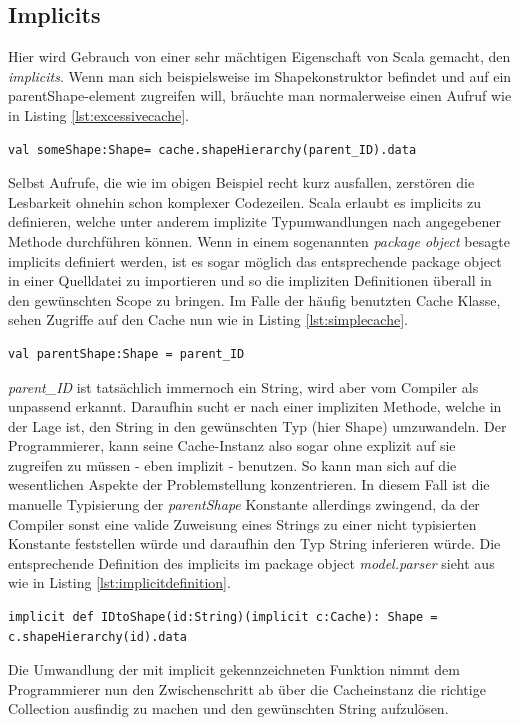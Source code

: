 \subsection{Implicits}\label{sectionimplicit}
Hier wird Gebrauch von einer sehr mächtigen Eigenschaft von Scala gemacht, den \textit{implicits}. Wenn man sich beispielsweise im Shapekonstruktor befindet und auf ein parentShape-element zugreifen will, bräuchte man normalerweise einen Aufruf wie in Listing \ref{lst:excessivecache}.
\begin{lstlisting}[style=scala, caption = {Ausführlicher Zugriff auf ein Cache Element}, label = {lst:excessivecache}]
val someShape:Shape= cache.shapeHierarchy(parent_ID).data
\end{lstlisting}Selbst Aufrufe, die wie im obigen Beispiel recht kurz ausfallen, zerstören die Lesbarkeit ohnehin schon komplexer Codezeilen. Scala erlaubt es implicits zu definieren, welche unter anderem implizite Typumwandlungen nach angegebener Methode durchführen können. Wenn in einem sogenannten \textit{package object} besagte implicits definiert werden, ist es sogar möglich das entsprechende package object in einer Quelldatei zu importieren und so die impliziten Definitionen überall in den gewünschten Scope zu bringen. Im Falle der häufig benutzten Cache Klasse, sehen Zugriffe auf den Cache nun wie in Listing \ref{lst:simplecache}.
\begin{lstlisting}[style=scala, caption = {Vereinfachter Zugriff auf ein Cache Element}, label = {lst:simplecache}]
val parentShape:Shape = parent_ID
\end{lstlisting}
\textit{parent\_ID} ist tatsächlich immernoch ein String, wird aber vom Compiler als unpassend erkannt. Daraufhin sucht er nach einer impliziten Methode, welche in der Lage ist, den String in den gewünschten Typ (hier Shape) umzuwandeln. Der Programmierer, kann seine Cache-Instanz also sogar ohne explizit auf sie zugreifen zu müssen - eben implizit - benutzen. So kann man sich auf die wesentlichen Aspekte der Problemstellung konzentrieren. In diesem Fall ist die manuelle Typisierung der \textit{parentShape} Konstante allerdings zwingend, da der Compiler sonst eine valide Zuweisung eines Strings zu einer nicht typisierten Konstante feststellen würde und daraufhin den Typ String inferieren würde. Die entsprechende Definition des implicits im package object \textit{model.parser} sieht aus wie in Listing \ref{lst:implicitdefinition}.
\begin{lstlisting}[style=scala, caption = {Definition einer Impliziten Typumwandlung}, label = {lst:implicitdefinition}]
implicit def IDtoShape(id:String)(implicit c:Cache): Shape =
c.shapeHierarchy(id).data
\end{lstlisting}Die Umwandlung der mit implicit gekennzeichneten Funktion nimmt dem Programmierer nun den Zwischenschritt ab über die Cacheinstanz die richtige Collection ausfindig zu machen und den gewünschten String aufzulösen.
